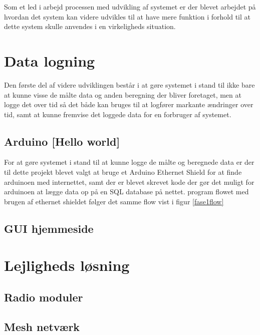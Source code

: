 Som et led i arbejd processen med udvikling af systemet er der blevet arbejdet på hvordan det system kan videre udvikles til at have mere funktion i forhold til at dette system skulle anvendes i en virkeligheds situation.

\section{Data logning}
Den første del af videre udviklingen består i at gøre systemet i stand til ikke bare at kunne visse de målte data og anden beregning der bliver foretaget, men at logge det over tid så det både kan bruges til at logfører markante ændringer over tid, samt at kunne fremvise det loggede data for en forbruger af systemet.

\subsection{Arduino [Hello world]}
For at gøre systemet i stand til at kunne logge de målte og beregnede data er der til dette projekt blevet valgt at bruge et Arduino Ethernet Shield for at finde arduinoen med internettet, samt der er blevet skrevet kode der gør det muligt for arduinoen at lægge data op på en SQL database på nettet.
program flowet med brugen af ethernet shieldet følger det samme flow vist i figur \ref{fase1flow}

\subsection{GUI hjemmeside}
\section{Lejligheds løsning}
\subsection{Radio moduler}
\subsection{Mesh netværk}
